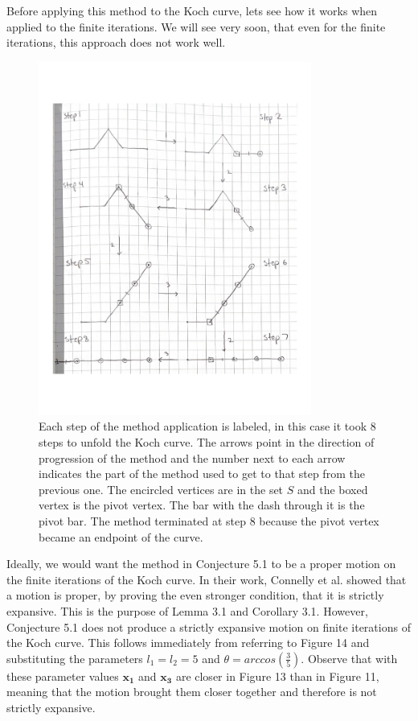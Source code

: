 \documentclass{article}
\theoremstyle{definition}
\begin{document}
\noindent Before applying this method to the Koch curve, lets see how it works when applied to the finite iterations. We will see very soon, that even for the finite iterations, this approach does not work well.\vspace{0.5em}\\
\begin{figure}[H]
    \centering
    \includegraphics[width=0.8\textwidth]{KochUnfoldingMethod.pdf}
    \caption{Each step of the method application is labeled, in this case it took 8 steps to unfold the Koch curve. The arrows point in the direction of progression of the method and the number next to each arrow indicates the part of the method used to get to that step from the previous one. The encircled vertices are in the set $S$ and the boxed vertex is the pivot vertex. The bar with the dash through it is the pivot bar. The method terminated at step 8 because the pivot vertex became an endpoint of the curve.}
\end{figure}
\noindent Ideally, we would want the method in Conjecture 5.1 to be a proper motion on the finite iterations of the Koch curve. In their work, Connelly et al. showed that a motion is proper, by proving the even stronger condition, that it is strictly expansive. This is the purpose of Lemma 3.1 and Corollary 3.1. However, Conjecture 5.1 does not produce a strictly expansive motion on finite iterations of the Koch curve. This follows immediately from referring to Figure 14 and substituting the parameters $l_1 = l_2 = 5$ and $\theta = arccos(\frac{3}{5})$. Observe that with these parameter values $\mathbf{x_1}$ and $\mathbf{x_3}$ are closer in Figure 13 than in Figure 11, meaning that the motion brought them closer together and therefore is not strictly expansive.
\end{document}

